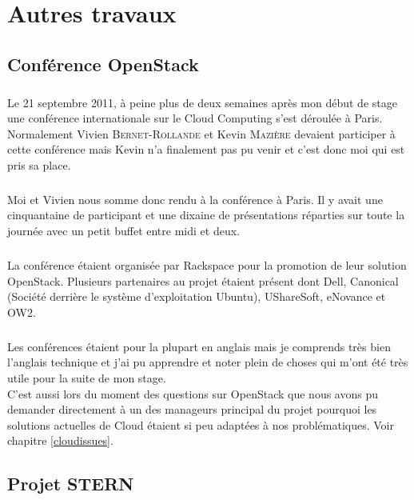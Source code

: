 \chapter{Autres travaux}

\section{Conférence OpenStack}
\paragraph*{}
Le 21 septembre 2011, à peine plus de deux semaines après mon début de stage une conférence internationale sur le Cloud Computing s'est déroulée à Paris.
Normalement Vivien \textsc{Bernet-Rollande} et Kevin \textsc{Mazière} devaient participer à cette conférence mais Kevin n'a finalement pas pu venir et c'est donc
moi qui est pris sa place.

\paragraph*{}
Moi et Vivien nous somme donc rendu à la conférence à Paris.
Il y avait une cinquantaine de participant et une dixaine de présentations réparties sur toute la journée avec un petit buffet entre midi et deux.

\paragraph*{}
La conférence étaient organisée par Rackspace pour la promotion de leur solution OpenStack. Plusieurs partenaires au projet étaient présent dont Dell, Canonical (Société derrière
le système d'exploitation Ubuntu), UShareSoft, eNovance et OW2.

\paragraph*{}
Les conférences étaient pour la plupart en anglais mais je comprends très bien l'anglais technique et j'ai pu apprendre et noter plein de choses qui m'ont été très utile
pour la suite de mon stage.\\
C'est aussi lors du moment des questions sur OpenStack que nous avons pu demander directement à un des manageurs principal du projet pourquoi les solutions actuelles de Cloud
étaient si peu adaptées à nos problématiques. Voir chapitre \ref{cloudissues}.


\section{Projet STERN}
